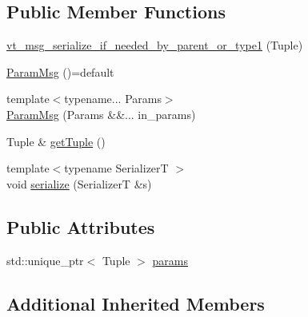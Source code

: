 \subsection*{Public Member Functions}
\begin{DoxyCompactItemize}
\item 
\hyperlink{structvt_1_1messaging_1_1_param_msg_3_01_tuple_00_01std_1_1enable__if__t_3_01not_01is__byte__copae27aaaf2bf1aaed1864cee3aebbc774_af6a20d70b8e4a2fbc8b0de42612dd8d6}{vt\+\_\+msg\+\_\+serialize\+\_\+if\+\_\+needed\+\_\+by\+\_\+parent\+\_\+or\+\_\+type1} (Tuple)
\item 
\hyperlink{structvt_1_1messaging_1_1_param_msg_3_01_tuple_00_01std_1_1enable__if__t_3_01not_01is__byte__copae27aaaf2bf1aaed1864cee3aebbc774_ab09a04140f07bf5b72c6f82cbcae8f9b}{Param\+Msg} ()=default
\item 
{\footnotesize template$<$typename... Params$>$ }\\\hyperlink{structvt_1_1messaging_1_1_param_msg_3_01_tuple_00_01std_1_1enable__if__t_3_01not_01is__byte__copae27aaaf2bf1aaed1864cee3aebbc774_abcda072cf1e80d5687212b1c59d7c253}{Param\+Msg} (Params \&\&... in\+\_\+params)
\item 
Tuple \& \hyperlink{structvt_1_1messaging_1_1_param_msg_3_01_tuple_00_01std_1_1enable__if__t_3_01not_01is__byte__copae27aaaf2bf1aaed1864cee3aebbc774_ad68e4bf3b45364439d5c7c8d38499a53}{get\+Tuple} ()
\item 
{\footnotesize template$<$typename SerializerT $>$ }\\void \hyperlink{structvt_1_1messaging_1_1_param_msg_3_01_tuple_00_01std_1_1enable__if__t_3_01not_01is__byte__copae27aaaf2bf1aaed1864cee3aebbc774_a29827e82e34aa1666e2bb5a70076c40b}{serialize} (SerializerT \&s)
\end{DoxyCompactItemize}
\subsection*{Public Attributes}
\begin{DoxyCompactItemize}
\item 
std\+::unique\+\_\+ptr$<$ Tuple $>$ \hyperlink{structvt_1_1messaging_1_1_param_msg_3_01_tuple_00_01std_1_1enable__if__t_3_01not_01is__byte__copae27aaaf2bf1aaed1864cee3aebbc774_a13490c5a4771ee0fdc5e56087aa7801b}{params}
\end{DoxyCompactItemize}
\subsection*{Additional Inherited Members}


